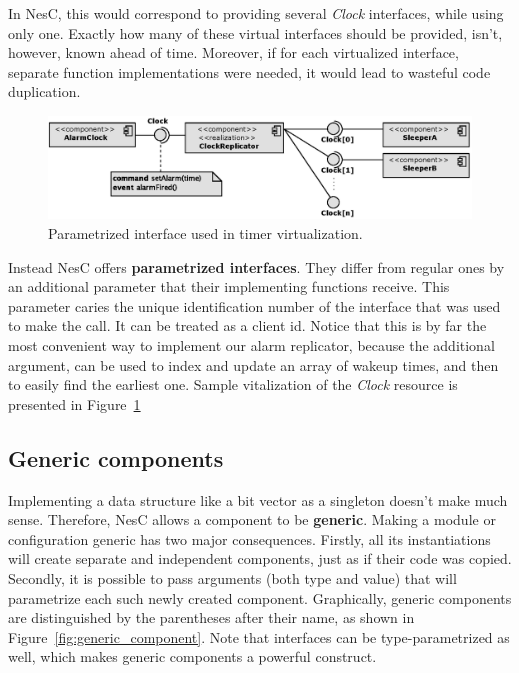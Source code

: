 In NesC, this would correspond to providing several \emph{Clock} interfaces, while using only one. Exactly how many of these virtual interfaces should be provided, isn't, however, known ahead of time.  Moreover, if for each virtualized interface, separate function implementations were needed, it would lead to wasteful code duplication.

\begin{figure}[h]
  \centering
  \includegraphics[width=1.0\textwidth]{diagrams/parametrized_interface.eps}
  \caption{Parametrized interface used in timer virtualization.}
  \label{fig:parametrized_interface}
\end{figure}

Instead NesC offers {\bf parametrized interfaces}. They differ from regular ones by an additional parameter that their implementing functions receive. This parameter caries the unique identification number of the interface that was used to make the call. It can be treated as a client id.   Notice that this is by far the most convenient way to implement our alarm replicator, because the additional argument, can be used to index and update an array of wakeup times, and then to easily find the earliest one. Sample vitalization of the \emph{Clock} resource is presented in Figure~\ref{fig:parametrized_interface}

\subsection{Generic components}

Implementing a data structure like a bit vector as a singleton doesn't make much sense. Therefore, NesC allows a component to be {\bf generic}. Making a module or configuration generic has two major consequences. Firstly, all its instantiations will create separate and independent components, just as if their code was copied. Secondly, it is possible to pass arguments (both type and value) that will parametrize each such newly created component. Graphically, generic components are distinguished by the parentheses after their name, as shown in Figure~\ref{fig:generic_component}. Note that interfaces
can be type-parametrized as well, which makes generic components a powerful construct.

